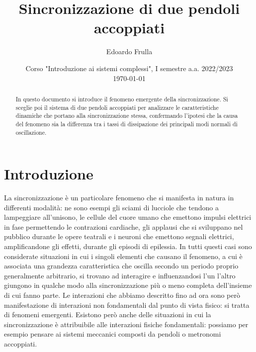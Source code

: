 \documentclass[11pt, a4paper, twoside, italian]{article}
\author{Edoardo Frulla}
\date{Corso "Introduzione ai sistemi complessi", I semestre a.a. 2022/2023 \\ \vspace{0.3cm} \today}
\title{Sincronizzazione di due pendoli accoppiati}
\begin{document}
\maketitle
    \begin{abstract}
        In questo documento si introduce il fenomeno emergente della sincronizzazione.
        Si sceglie poi il sistema di due pendoli accoppiati per analizzare le caratteristiche
        dinamiche che portano alla sincronizzazione stessa, confermando l'ipotesi che
        la causa del fenomeno sia la differenza tra i tassi di dissipazione dei principali
        modi normali di oscillazione.
    \end{abstract}

\section{Introduzione}
La sincronizzazione è un particolare fenomeno che si manifesta in natura in differenti modalità: ne sono esempi gli sciami di lucciole che tendono a lampeggiare all'unisono, le cellule del cuore umano che emettono impulsi elettrici in fase permettendo le contrazioni cardiache, gli applausi che si sviluppano nel pubblico durante le opere teatrali e i neuroni che emettono segnali elettrici, amplificandone gli effetti, durante gli episodi di epilessia.
In tutti questi casi sono considerate situazioni in cui i singoli elementi che causano il fenomeno, a cui è associata una grandezza caratteristica che oscilla secondo un periodo proprio generalmente arbitrario, si trovano ad interagire e influenzandosi l'un l'altro giungono in qualche modo alla sincronizzazione più o meno completa dell'insieme di cui fanno parte.
Le interazioni che abbiamo descritto fino ad ora sono però manifestazione di interazioni non fondamentali dal punto di vista fisico: si tratta di fenomeni emergenti. 
Esistono però anche delle situazioni in cui la sincronizzazione è attribuibile alle interazioni fisiche fondamentali: possiamo per esempio pensare ai sistemi meccanici composti da pendoli o metronomi accoppiati.
\end{document}
